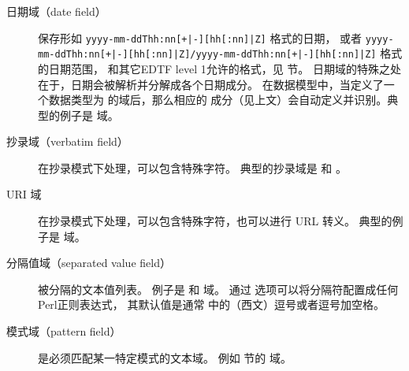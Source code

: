 \begin{description}
\begin{description}
\item[日期域（date field）] 保存形如 \texttt{yyyy-mm-ddThh:nn[+|-][hh[:nn]|Z]} 格式的日期，
或者 \texttt{yyyy-mm-ddThh:nn[+|-][hh[:nn]|Z]/yyyy-mm-ddThh:nn[+|-][hh[:nn]|Z]} 格式的日期范围，
和其它EDTF level 1允许的格式，见  节。
日期域的特殊之处在于，日期会被解析并分解成各个日期成分。
在数据模型中，当定义了一个数据类型为  的域后，那么相应的  成分（见上文）会自动定义并识别。典型的例子是  域。


\item[抄录域（verbatim field）] 在抄录模式下处理，可以包含特殊字符。
典型的抄录域是  和 。

\item[URI 域] 在抄录模式下处理，可以包含特殊字符，也可以进行 URL 转义。
典型的例子是  域。


\item[分隔值域（separated value field）]
被分隔的文本值列表。
例子是  和  域。
通过  选项可以将分隔符配置成任何Perl正则表达式，
其默认值是通常 \BibTeX 中的（西文）逗号或者逗号加空格。


\item[模式域（pattern field）] 是必须匹配某一特定模式的文本域。
例如  节的  域。



\end{description}
\end{description}

